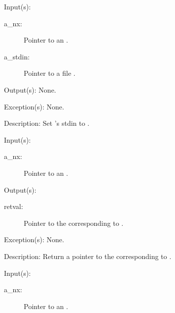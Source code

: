 \begin{capi}
\label{nx_stdin_set}
	\begin{capilist}
	\item[Input(s): ]
		\begin{description}\item[]
		\item[a\_nx: ]
			Pointer to an .
		\item[a\_stdin: ]
			Pointer to a file .
		\end{description}
	\item[Output(s): ] None.
	\item[Exception(s): ] None.
	\item[Description: ]
		Set 's stdin to .
	\end{capilist}
\label{nx_stdout_get}
	\begin{capilist}
	\item[Input(s): ]
		\begin{description}\item[]
		\item[a\_nx: ]
			Pointer to an \classname{nx}.
		\end{description}
	\item[Output(s): ]
		\begin{description}\item[]
		\item[retval: ]
			Pointer to the  corresponding to
			\onyxop{stdout}{}.
		\end{description}
	\item[Exception(s): ] None.
	\item[Description: ]
		Return a pointer to the  corresponding to
		\onyxop{stdout}{}.
	\end{capilist}
\label{nx_stdout_set}
	\begin{capilist}
	\item[Input(s): ]
		\begin{description}\item[]
		\item[a\_nx: ]
			Pointer to an .

\end{description}
\end{capilist}
\end{capi}
